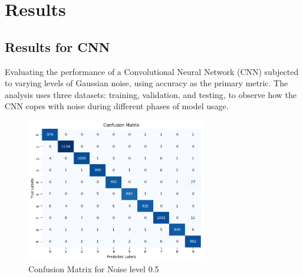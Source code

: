 \chapter{Results}

\section{Results for CNN}
\label{ch:results}
Evaluating the performance of a Convolutional Neural Network (CNN) subjected to varying levels of Gaussian noise, using accuracy as the primary metric. The analysis uses three datasets: training, validation, and testing, to observe how the CNN copes with noise during different phases of model usage.

\begin{figure}[htbp]
  \centering
  \includegraphics[width=0.7\textwidth]{figures/NL5_Confusionmatrix.png}
  \caption{Confusion Matrix for Noise level 0.5}
  \label{fig:nl5_cm}
\end{figure}


